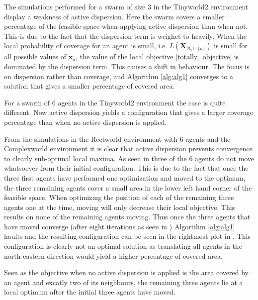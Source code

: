 The simulations performed for a swarm of size 3 in the Tinyworld2 environment display a weakness of active dispersion. Here the swarm covers a smaller percentage of the 
feasible space when applying active dispersion than when not. This is due to the fact that the dispersion term is weighet to heavily. When the local probability of coverage for an agent is small, i.e. $L(\mathbf{X}_{\mathcal{B}_{a}\cup\{a\}})$ is small 
for all possible values of $\mathbf{x}_{a}$, the value of 
the local objective \eqref{totally_objective} is dominated by the dispersion term. This causes a shift in behaviour. The focus is on dispersion rather than coverage, and Algorithm \ref{alg:alg1} converges
to a solution that gives a smaller percentage of covered area.

For a swarm of 6 agents in the Tinyworld2 environment the case is quite different. Now active dispersion yields a configuration that gives a larger coverage percentage than when no active
dispersion is applied.

From the simulations in the Rectworld environment with 6 agents and the Complexworld environment it is 
clear that active dispersion prevents convergence to clearly sub-optimal local maxima. As seen in  three of the 
6 agents do not move whatsoever from their initial configuration. This is due to the fact that once the three first agents have performed one optimization and moved to the 
optimum, the three remaining agents cover a small area in the lower left hand corner of the feasible space. When optimizing the position of each of the remaining three agents
one at the time, moving will only decrease their local objective. This results on none of the remaining agents moving. Thus once the three agents that have moved converge (after eight iterations as seen in ) Algorithm \ref{alg:alg1} haults and the resulting configuration 
can be seen in the rightmost plot in . This configuration is clearly not an optimal solution as translating all agents in the north-eastern direction would yield a higher 
percentage of covered area. 


Seen as the objective when no active dispersion is applied is the area covered
by an agent and excatly two of its neighbours, the remaining three agents lie at a local optimum after the initial three agents have moved.